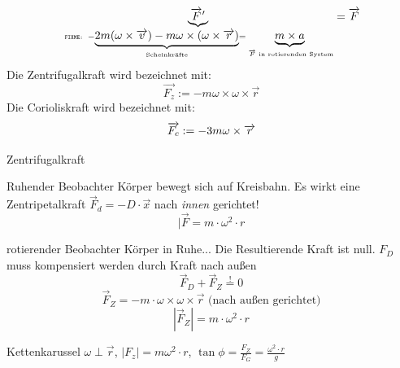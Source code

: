 \documentclass[a4paper,10pt]{scrartcl}
\begin{document}
\begin{enumerate}[a)]
 \[
  \underbrace{\overrightarrow{F}'}_{\text{\tiny{\;\texttt{FIXME:} \;}}-\underbrace{2m(\omega\times \overrightarrow{v})
-m\omega\times(\omega\times\overrightarrow{r})}_{\text{\tiny{Scheinkräfte}}}
=\underbrace{m\times a}_{\text{ $\overrightarrow{F}$ in rotierenden System}}}=\overrightarrow{F}
 \]
 Die Zentrifugalkraft wird bezeichnet mit:
 \[
  \vec{F_z}:=-m\omega\times \omega \times \vec r 
 \]
 Die Corioliskraft wird bezeichnet mit:
 \[
  \overrightarrow{F_c}:=-3m\omega\times \overrightarrow{r}
\]
 \begin{seg}{Zentrifugalkraft}
 \begin{seg}{Ruhender Beobachter}
 Körper bewegt sich auf Kreisbahn. Es wirkt eine Zentripetalkraft $\vec F_d=-D\cdot \vec x$ nach \emph{innen} gerichtet!
 \[
  |\vec F=m\cdot \omega ^2\cdot r
 \]
 \end{seg}
 \begin{seg}{rotierender Beobachter}
 Körper in Ruhe... Die Resultierende Kraft ist null.  $F_D$ muss kompensiert werden durch Kraft nach außen
 \[
  \vec F_D+\vec F_Z\stackrel{!}{=}0
 \]
 \[
  \vec F_Z=-m\cdot \omega\times \omega \times \vec r \text{ (nach außen gerichtet)}
  \]
 \[
 |\vec F_Z|=m\cdot \omega ^2\cdot r  
  \]
 \end{seg}
\end{seg}
\begin{seg}{Kettenkarussel}
$\omega \perp \vec r$, $|F_z|=m\omega^2\cdot r$, $\tan\phi=\frac{F_Z}{F_G}=\frac{\omega^2\cdot r}{g}$


\end{seg}
\end{enumerate}
\end{document}
